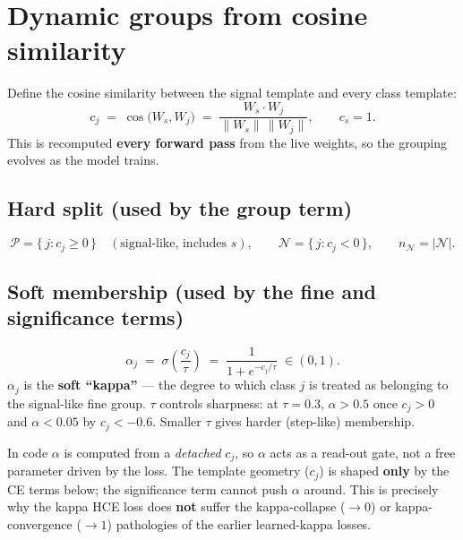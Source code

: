 \documentclass[11pt]{article}
\newcommand{\Pset}{\mathcal{P}}
\newcommand{\Nset}{\mathcal{N}}
\begin{document}
\section{Dynamic groups from cosine similarity}
Define the cosine similarity between the signal template and every class template:
\begin{equation}
c_j \;=\; \cos\!\big(W_s, W_j\big) \;=\; \frac{W_s \cdot W_j}{\lVert W_s\rVert \, \lVert W_j\rVert},
\qquad c_s = 1 .
\end{equation}
This is recomputed \textbf{every forward pass} from the live weights, so the grouping evolves as
the model trains.

\subsection{Hard split (used by the group term)}
\begin{equation}
\Pset = \{\, j : c_j \ge 0 \,\} \quad(\text{signal-like, includes } s), \qquad
\Nset = \{\, j : c_j < 0 \,\}, \qquad n_\Nset = |\Nset| .
\end{equation}

\subsection{Soft membership (used by the fine and significance terms)}
\begin{equation}
\alpha_j \;=\; \sigma\!\left(\frac{c_j}{\tau}\right) \;=\; \frac{1}{1 + e^{-c_j/\tau}}
\;\in (0,1).
\end{equation}
$\alpha_j$ is the \textbf{soft ``kappa''} --- the degree to which class $j$ is treated as
belonging to the signal-like fine group. $\tau$ controls sharpness: at $\tau = 0.3$,
$\alpha > 0.5$ once $c_j > 0$ and $\alpha < 0.05$ by $c_j < -0.6$. Smaller $\tau$ gives harder
(step-like) membership.

\begin{tcolorbox}[colback=blue!4,colframe=blue!40,title=Stop-gradient]
In code $\alpha$ is computed from a \emph{detached} $c_j$, so $\alpha$ acts as a read-out gate,
not a free parameter driven by the loss. The template geometry ($c_j$) is shaped \textbf{only} by
the CE terms below; the significance term cannot push $\alpha$ around. This is precisely why the
kappa HCE loss does \textbf{not} suffer the kappa-collapse ($\to 0$) or kappa-convergence
($\to 1$) pathologies of the earlier learned-kappa losses.
\end{tcolorbox}
\end{document}
